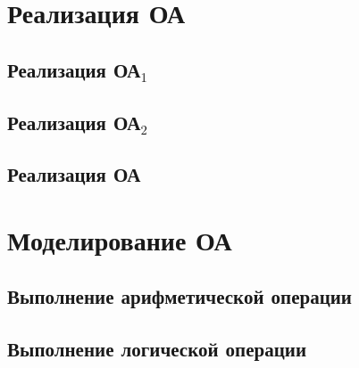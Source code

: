 
\newpage
\section{Реализация ОА}

\subsection{Реализация ОА${}_1$}

\subsection{Реализация ОА${}_2$}

\subsection{Реализация ОА}

\newpage
\section{Моделирование ОА}

\subsection{Выполнение арифметической операции}

\subsection{Выполнение логической операции}